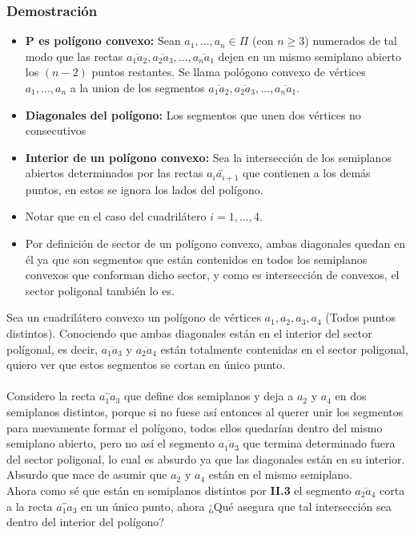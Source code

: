 \documentclass[a4paper]{article}
\begin{document}
\subsubsection{Demostración}
\begin{itemize}
    \item \textbf{P es polígono convexo:} Sean $a_1,\dots, a_n \in \Pi$ (con $n\geq 3$) numerados de tal modo que las rectas $\overline{a_1a_2}, \overline{a_2a_3}, \dots, \overline{a_na_1}$ dejen en un mismo semiplano abierto los $(n-2)$ puntos restantes. Se llama pológono convexo de vértices $a_1,\dots,a_n$ a la union de los segmentos $\overline{a_1a_2}, \overline{a_2a_3}, \dots, \overline{a_na_1}$.
    \item \textbf{Diagonales del polígono:} Los segmentos que unen dos vértices no consecutivos
    \item \textbf{Interior de un polígono convexo:} Sea la intersección de los semiplanos abiertos determinados por las rectas $\overleftrightarrow{a_ia_{i+1}}$ que contienen a los demás puntos, en estos se ignora los lados del polígono.
    \item Notar que en el caso del cuadrilátero $i=1,\dots,4$.
    \item Por definición de sector de un polígono convexo, ambas diagonales quedan en él ya que son segmentos que están contenidos en todos los semiplanos convexos que conforman dicho sector, y como es intersección de convexos, el sector poligonal también lo es.
\end{itemize}
Sea un cuadrilátero convexo un polígono de vértices $a_1, a_2, a_3, a_4$ (Todos puntos distintos). Conociendo que ambas diagonales están en el interior del sector polígonal, es decir, $\overline{a_1a_3}$ y $\overline{a_2a_4}$ están totalmente contenidas en el sector poligonal, quiero ver que estos segmentos se cortan en único punto.\\\\
Considero la recta $\overleftrightarrow{a_1a_3}$ que define dos semiplanos y deja a $a_2$ y $a_4$ en dos semiplanos distintos, porque si no fuese así entonces al querer unir los segmentos para nuevamente formar el polígono, todos ellos quedarían dentro del mismo semiplano abierto, pero no así el segmento $\overline{a_1a_3}$ que termina determinado fuera del sector poligonal, lo cual es absurdo ya que las diagonales están en su interior. Absurdo que nace de asumir que $a_2$ y $a_4$ están en el mismo semiplano. \\
Ahora como sé que están en semiplanos distintos por \textbf{II.3} el segmento $\overline{a_2a_4}$ corta a la recta $\overleftrightarrow{a_1a_3}$ en un único punto, ahora ¿Qué asegura que tal intersección sea dentro del interior del polígono?
\end{document}
